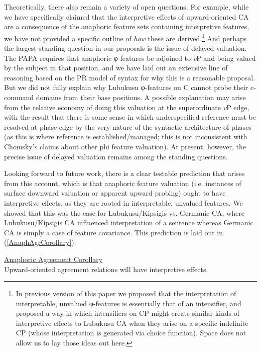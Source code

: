 Theoretically, there also remain a variety of open questions. For example, while we have specifically claimed that the interpretive effects of upward-oriented CA are a consequence of the anaphoric feature sets containing interpretive features, we have not provided a specific outline of \textit{how} these are derived.\footnote{In previous version of this paper we proposed that the interpretation of interpretable, unvalued φ-features is essentially that of an intensifier, and proposed a way in which intensifiers on CP might create similar kinds of interpretive effects to Lubukusu CA when they arise on a specific indefinite CP (whose interpretation is generated via choice function). Space does not allow us to lay those ideas out here.} And perhaps the largest standing question in our proposals is the issue of delayed valuation. The PAPA requires that anaphoric φ-features be adjoined to \textit{v}P and being valued by the subject in that position, and we have laid out an extensive line of reasoning based on the PR model of syntax for why this is a reasonable proposal. But we did not fully explain why Lubukusu φ-features on C cannot probe their c-command domains from their base positions. A possible explanation may arise from the relative economy of doing this valuation at the superordinate \textit{v}P edge, with the result that there is some sense in which underspecified reference must be resolved at phase edge by the very nature of the syntactic architecture of phases (as this is where reference is established/managed; this is not inconsistent with Chomsky's \citeyear{Chomsky:2008} claims about other phi feature valuation). At present, however, the precise issue of delayed valuation remains among the standing questions. 

Looking forward to future work, there is a clear testable prediction that arises from this account, which is that anaphoric feature valuation (i.e. instances of surface downward valuation or apparent upward probing) ought to have interpretive effects, as they are rooted in interpretable, unvalued features. We showed that this was the case for Lubukusu/Kipsigis vs. Germanic CA, where Lubukusu/Kipsigis CA influenced interpretation of a sentence whereas Germanic CA is simply a case of feature covariance. This prediction is laid out in (\ref{AnaphAgrCorollary}): 

\ea \label{AnaphAgrCorollary}
\underline{Anaphoric Agreement Corollary} \\
Upward-oriented agreement relations will have interpretive effects.
\z

